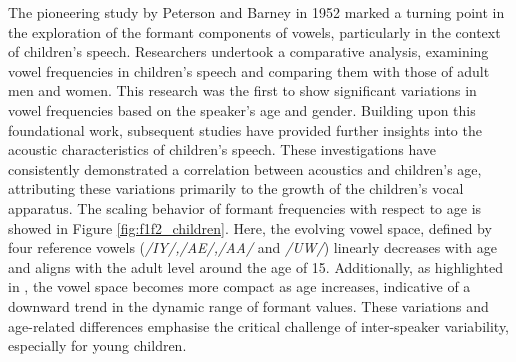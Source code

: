 The pioneering study by Peterson and Barney in 1952 \cite{first_vowel_study} marked a turning point in the exploration of the formant components of vowels, particularly in the context of children's speech. Researchers undertook a comparative analysis, examining vowel frequencies in children's speech and comparing them with those of adult men and women. This research was the first to show significant variations in vowel frequencies based on the speaker's age and gender. Building upon this foundational work, subsequent studies \cite{reviewASRchildren,Acoustic_change_children,why_children_speech_no_working} have provided further insights into the acoustic characteristics of children's speech. These investigations have consistently demonstrated a correlation between acoustics and children's age, attributing these variations primarily to the growth of the children's vocal apparatus. The scaling behavior of formant frequencies with respect to age is showed in Figure \ref{fig:f1f2_children}. Here, the evolving vowel space, defined by four reference vowels (\textit{/IY/,/AE/,/AA/} and \textit{/UW/}) linearly decreases with age and aligns with the adult level around the age of 15. Additionally, as highlighted in \cite{reviewASRchildren}, the vowel space becomes more compact as age increases, indicative of a downward trend in the dynamic range of formant values. These variations and age-related differences emphasise the critical challenge of inter-speaker variability, especially for young children.


